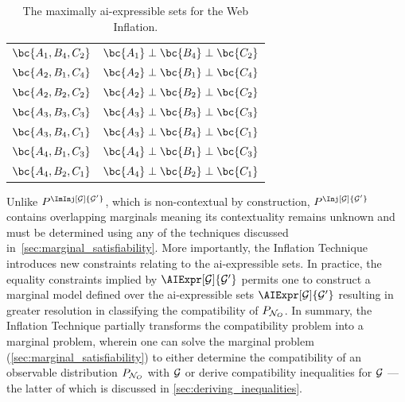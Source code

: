 \documentclass[aps, 10pt, english, twoside, pra, nofootinbib, tightenlines, longbibliography, superscriptaddress]{revtex4-1}
\begin{document}
\begin{nscenter}
\begin{table}
{\begin{tabular}{|c|c|}
                $\bc{A_1, B_4, C_2}$ & $\bc{A_1} \ancestralindep \bc{B_4} \ancestralindep \bc{C_2}$ \\
                $\bc{A_2, B_1, C_4}$ & $\bc{A_2} \ancestralindep \bc{B_1} \ancestralindep \bc{C_4}$ \\
                $\bc{A_2, B_2, C_2}$ & $\bc{A_2} \ancestralindep \bc{B_2} \ancestralindep \bc{C_2}$ \\
                $\bc{A_3, B_3, C_3}$ & $\bc{A_3} \ancestralindep \bc{B_3} \ancestralindep \bc{C_3}$ \\
                $\bc{A_3, B_4, C_1}$ & $\bc{A_3} \ancestralindep \bc{B_4} \ancestralindep \bc{C_1}$ \\
                $\bc{A_4, B_1, C_3}$ & $\bc{A_4} \ancestralindep \bc{B_1} \ancestralindep \bc{C_3}$ \\
                $\bc{A_4, B_2, C_1}$ & $\bc{A_4} \ancestralindep \bc{B_2} \ancestralindep \bc{C_1}$ \\
                \hline
            \end{tabular}
            \caption{The maximally ai-expressible sets for the Web Inflation.
            \label{tab:asexpr_triangle_structure_web}}
        }
        \end{table}
    \end{nscenter}

    Unlike $\prob^{\ImInj[\graph]{\graph'}}$, which is non-contextual by construction, $\prob^{\Inj[\graph]{\graph'}}$ contains overlapping marginals meaning its contextuality remains unknown and must be determined using any of the techniques discussed in~\cref{sec:marginal_satisfiability}. More importantly, the Inflation Technique introduces new constraints relating to the ai-expressible sets. In practice, the equality constraints implied by $\AIExpr[\graph]{\graph'}$ permits one to construct a marginal model defined over the ai-expressible sets $\AIExpr[\graph]{\graph'}$ resulting in greater resolution in classifying the compatibility of $\prob[\nodes_O]$. In summary, the Inflation Technique partially transforms the compatibility problem into a marginal problem, wherein one can solve the marginal problem (\cref{sec:marginal_satisfiability}) to either determine the compatibility of an observable distribution $\prob[\nodes_O]$ with $\mathcal{G}$ or derive compatibility inequalities for $\mathcal{G}$ --- the latter of which is discussed in \cref{sec:deriving_inequalities}.


\end{document}
